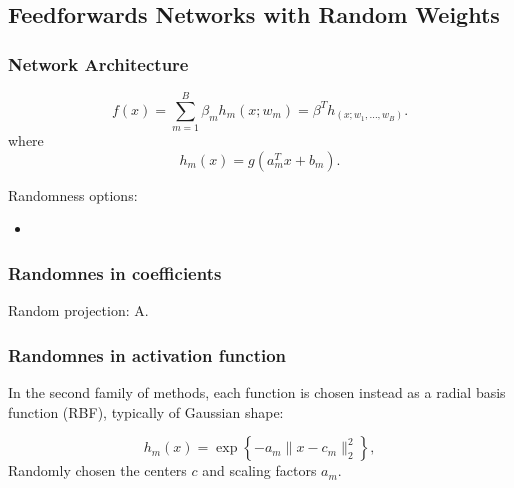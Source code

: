 \subsection{Feedforwards Networks with Random Weights}

\begin{frame}
    \frametitle{Network Architecture}

    \begin{equation}
        f(x)
        = 
        \sum_{m = 1}^B
        \beta_m h_m(x; w_m)
        = 
        \beta^T h_(x; w_1, \ldots, w_B). 
    \end{equation}
    where 
    \begin{equation}
        h_m(x) = g(a^T_m x + b_m).
    \end{equation}

    Randomness options: 
    \begin{itemize}
        \item 
    \end{itemize}
\end{frame}

\begin{frame}
    \frametitle{Randomnes in coefficients}
    Random projection: A. 

\end{frame}


\begin{frame}
    \frametitle{Randomnes in activation function}

    In the second family of methods, each function
is chosen instead as a radial basis function (RBF),
typically of Gaussian shape:

\begin{equation}
    h_m(x)
    = 
    \exp\left\{
        -a_m 
        \|x - c_m\|_2^2 
        \right\},
\end{equation}
Randomly chosen the centers $c$ and scaling factors $a_m$. 

\end{frame}


